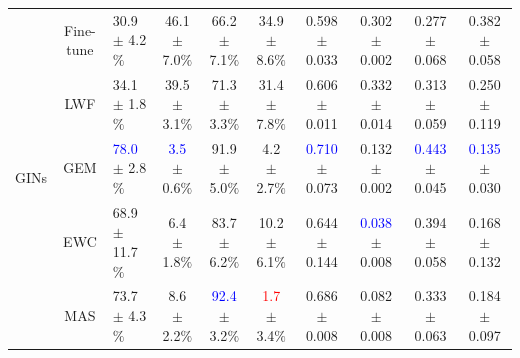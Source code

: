 \documentclass[letterpaper]{article} %
\begin{document}
\begin{table}[]
{\begin{tabular}{c|c|lc|cc|cc|cc}
                                                                        \toprule
\multirow{7}{*}{GINs}                                                   & Fine-tune                 & 30.9 $\pm$ 4.2$\%$ & 46.1 $\pm$ 7.0$\%$                          & 66.2 $\pm$ 7.1$\%$                           & 34.9 $\pm$ 8.6$\%$                         & 0.598 $\pm$ 0.033                           & 0.302 $\pm$ 0.002                           & 0.277 $\pm$ 0.068    & 0.382 $\pm$ 0.058                           \\ %
                                                                       & LWF                      & 34.1 $\pm$ 1.8$\%$ & 39.5 $\pm$ 3.1$\%$                          & 71.3 $\pm$ 3.3$\%$                           & 31.4 $\pm$ 7.8$\%$                           & 0.606 $\pm$ 0.011                           & 0.332 $\pm$ 0.014                           & 0.313 $\pm$ 0.059    & 0.250 $\pm$ 0.119                           \\
                                                                       & GEM                      & \textcolor{blue}{78.0} $\pm$ 2.8$\%$ & \textcolor{blue}{3.5} $\pm$ 0.6$\%$                           & 91.9 $\pm$ 5.0$\%$                           & 4.2 $\pm$ 2.7$\%$                           & \textcolor{blue}{0.710} $\pm$ 0.073                           & 0.132 $\pm$ 0.002                           & \textcolor{blue}{0.443} $\pm$ 0.045    & \textcolor{blue}{0.135} $\pm$ 0.030                             \\
                                                                                                    & EWC                      & 68.9 $\pm$ 11.7$\%$ & 6.4 $\pm$ 1.8$\%$                           & 83.7 $\pm$ 6.2$\%$                           & 10.2 $\pm$ 6.1$\%$                           & 0.644 $\pm$ 0.144                           & \textcolor{blue}{0.038} $\pm$ 0.008                           & 0.394 $\pm$ 0.058    & 0.168 $\pm$ 0.132                          \\
                                                                                                    & MAS                      & 73.7 $\pm$ 4.3$\%$ & 8.6 $\pm$ 2.2$\%$                           & \textcolor{blue}{92.4} $\pm$ 3.2$\%$                           & \textcolor{red}{1.7} $\pm$ 3.4$\%$                           & 0.686 $\pm$ 0.008                           & 0.082 $\pm$ 0.008                           & 0.333 $\pm$ 0.063    & 0.184 $\pm$ 0.097                          \\
                                          

\end{tabular}}
\end{table}
\end{document}
